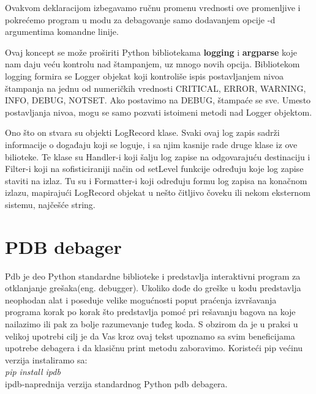 \documentclass[a4paper]{article}
\begin{document}
Ovakvom deklaracijom izbegavamo ručnu promenu vrednosti ove promenljive i pokrećemo program u modu za debagovanje samo dodavanjem opcije -d argumentima komandne linije. 

Ovaj koncept se može proširiti Python bibliotekama \textbf{logging} \cite{logDocPyt} i \textbf{argparse} koje nam daju veću kontrolu nad štampanjem, uz mnogo novih opcija. Bibliotekom logging formira se Logger objekat koji kontroliše ispis postavljanjem nivoa štampanja na jednu od numeričkih vrednosti CRITICAL, ERROR, WARNING,  INFO, DEBUG, NOTSET. Ako postavimo na DEBUG, štampaće se sve. Umesto postavljanja nivoa, mogu se samo pozvati istoimeni metodi nad Logger objektom.

Ono što on stvara su objekti LogRecord klase. Svaki ovaj log zapis sadrži informacije o događaju koji se loguje, i sa njim kasnije rade druge klase iz ove bilioteke. Te klase su Handler-i koji šalju log zapise na odgovarajuću destinaciju i Filter-i koji na sofisticiraniji način od setLevel funkcije određuju koje log zapise staviti na izlaz. Tu su i Formatter-i koji određuju formu log zapisa na konačnom izlazu, mapirajući LogRecord objekat u nešto čitljivo čoveku ili nekom eksternom sistemu, najčešće string. 

\section{PDB debager}
Pdb je deo Python standardne biblioteke i predstavlja interaktivni program za otklanjanje grešaka(eng. debugger)\cite{pdbDocPyt}. Ukoliko dođe do greške u kodu predstavlja neophodan alat i poseduje velike mogućnosti poput praćenja izvršavanja programa korak po korak što predstavlja pomoć pri rešavanju bagova na koje nailazimo ili pak za bolje razumevanje tuđeg koda. S obzirom da je u praksi u velikoj upotrebi cilj je da Vas kroz ovaj tekst upoznamo sa svim beneficijama upotrebe debagera i da klasičnu print metodu zaboravimo. Koristeći pip većinu verzija instaliramo sa:
\\ \emph{pip install ipdb}
\\ipdb-naprednija verzija standardnog Python pdb debagera.
\end{document}
